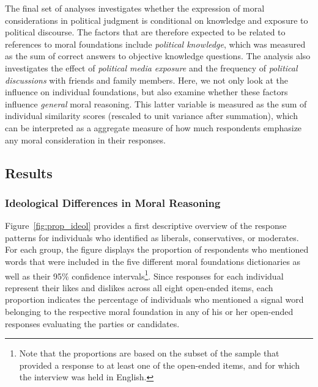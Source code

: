 \documentclass[12pt]{article}
\begin{document}
The final set of analyses investigates whether the expression of moral considerations in political judgment is conditional on knowledge and exposure to political discourse. The factors that are therefore expected to be related to references to moral foundations include \textit{political knowledge}, which was measured as the sum of correct answers to objective knowledge questions. The analysis also investigates the effect of \textit{political media exposure} and the frequency of \textit{political discussions} with friends and family members. Here, we not only look at the influence on individual foundations, but also examine whether these factors influence \textit{general} moral reasoning. This latter variable is measured as the sum of individual similarity scores (rescaled to unit variance after summation), which can be interpreted as a aggregate measure of how much respondents emphasize any moral consideration in their responses.



\subsection{Results}

\subsubsection{Ideological Differences in Moral Reasoning}

Figure~\ref{fig:prop_ideol} provides a first descriptive overview of the response patterns for individuals who identified as liberals, conservatives, or moderates. For each group, the figure displays the proportion of respondents who mentioned words that were included in the five different moral foundations dictionaries as well as their 95\% confidence intervals\footnote{Note that the proportions are based on the subset of the sample that provided a response to at least one of the open-ended items, and for which the interview was held in English.}. Since responses for each individual represent their likes and dislikes across all eight open-ended items, each proportion indicates the percentage of individuals who mentioned a signal word belonging to the respective moral foundation in any of his or her open-ended responses evaluating the parties or candidates.
\end{document}
